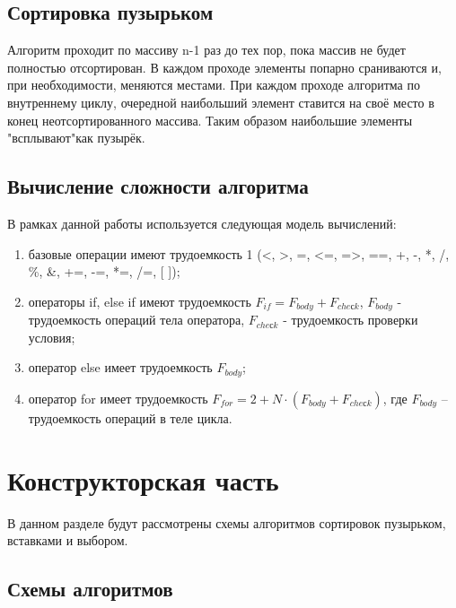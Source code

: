\documentclass[a4paper,12pt]{article}
\begin{document}
	\subsection{Сортировка пузырьком}
	\hfill
	
	Алгоритм проходит по массиву n-1 раз до тех пор, пока массив не будет
	полностью отсортирован. В каждом проходе элементы попарно сраниваются и,
	при необходимости, меняются местами. При каждом проходе алгоритма по
	внутреннему циклу, очередной наибольший элемент ставится на своё место в
	конец неотсортированного массива. Таким образом наибольшие элементы
	"всплывают"как пузырёк.
		
	\subsection{Вычисление сложности алгоритма}
	\hfill
	
	В рамках данной работы используется следующая модель вычислений:\\
	\begin{enumerate}
		\item базовые операции имеют трудоемкость 1 (<, >, =, <=, =>, ==, +, -, *, /, \%, \&, +=, -=, *=, /=,  [ ]);\\
		\item операторы if, else if имеют трудоемкость $F_{if} = F_{body} + F_{cheсk}$,  $F_{body}$ - трудоемкость операций тела оператора,  $F_{cheсk}$ - трудоемкость проверки условия;\\
		\item оператор else имеет трудоемкость $F_{body}$;\\
		\item оператор for имеет трудоемкость  $F_{for} = 2 + N \cdot (F_{body} + F_{cheсk})$, где $F_{body}$ – трудоемкость операций в теле цикла.\\
	\end{enumerate}

	\newpage
	\section{Конструкторская часть}
	\hfill
	
	В данном разделе будут рассмотрены схемы алгоритмов сортировок пузырьком, вставками и выбором. 
	
	\subsection{Схемы алгоритмов}
	\hfill
	
\end{document}
